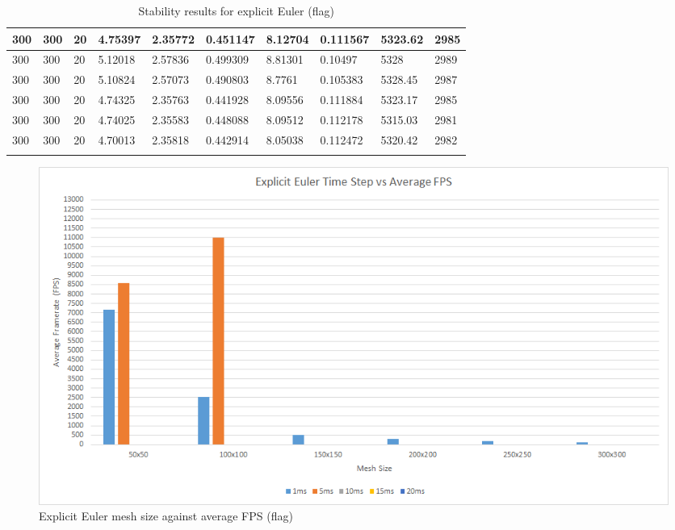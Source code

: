 \begin{landscape}
\begin{longtable}{ | l | l | l | l | l | l | l | l | l | l | }
300 & 300 & 20 & 4.75397 & 2.35772 & 0.451147 & 8.12704 & 0.111567 & 5323.62 & 2985\\ \hline
300 & 300 & 20 & 5.12018 & 2.57836 & 0.499309 & 8.81301 & 0.10497 & 5328 & 2989\\ \hline
300 & 300 & 20 & 5.10824 & 2.57073 & 0.490803 & 8.7761 & 0.105383 & 5328.45 & 2987\\ \hline
300 & 300 & 20 & 4.74325 & 2.35763 & 0.441928 & 8.09556 & 0.111884 & 5323.17 & 2985\\ \hline
300 & 300 & 20 & 4.74025 & 2.35583 & 0.448088 & 8.09512 & 0.112178 & 5315.03 & 2981\\ \hline
300 & 300 & 20 & 4.70013 & 2.35818 & 0.442914 & 8.05038 & 0.112472 & 5320.42 & 2982\\ \hline
   \caption{Stability results for explicit Euler (flag)}
   \label{tab:ee stability flag}
   \end{longtable}  

    \begin{figure}[!htb]
    \begin{center}
      \includegraphics[scale=0.95]{Figures/flag_ee_fps}
    \end{center}
    \caption{Explicit Euler mesh size against average FPS (flag)}
    \label{fig:ee fps flag}
  \end{figure}
\end{landscape}
  
